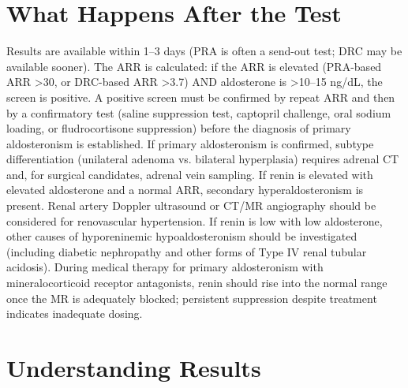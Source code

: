 \section*{What Happens After the Test}
Results are available within 1--3 days (PRA is often a send-out test; DRC may be available sooner). The ARR is calculated: if the ARR is elevated (PRA-based ARR >30, or DRC-based ARR >3.7) AND aldosterone is >10--15 ng/dL, the screen is positive. A positive screen must be confirmed by repeat ARR and then by a confirmatory test (saline suppression test, captopril challenge, oral sodium loading, or fludrocortisone suppression) before the diagnosis of primary aldosteronism is established. If primary aldosteronism is confirmed, subtype differentiation (unilateral adenoma vs. bilateral hyperplasia) requires adrenal CT and, for surgical candidates, adrenal vein sampling. If renin is elevated with elevated aldosterone and a normal ARR, secondary hyperaldosteronism is present. Renal artery Doppler ultrasound or CT/MR angiography should be considered for renovascular hypertension. If renin is low with low aldosterone, other causes of hyporeninemic hypoaldosteronism should be investigated (including diabetic nephropathy and other forms of Type IV renal tubular acidosis). During medical therapy for primary aldosteronism with mineralocorticoid receptor antagonists, renin should rise into the normal range once the MR is adequately blocked; persistent suppression despite treatment indicates inadequate dosing.

\section*{Understanding Results}

